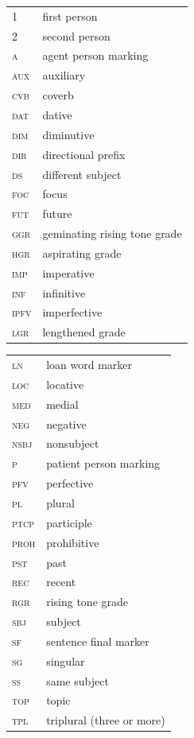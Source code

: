 \documentclass[output=paper,colorlinks,citecolor=brown]{langscibook}
\begin{document}
\begin{tabularx}{.45\textwidth}{lQ}
\scshape 1 & first person \\ 
\scshape 2 & second person \\ 
\scshape a & agent person marking \\
\scshape aux & auxiliary \\
\scshape cvb & coverb  \\
\scshape dat & dative  \\
\scshape dim & diminutive \\ 
\scshape dir & directional prefix  \\
\scshape ds & different subject \\ 
\scshape foc & focus  \\
\scshape fut & future  \\
\scshape ggr & geminating rising tone grade  \\
\scshape hgr & aspirating grade \\ 
\scshape imp & imperative  \\
\scshape inf & infinitive  \\
\scshape ipfv & imperfective  \\
\scshape lgr & lengthened grade  \\
\end{tabularx}
\begin{tabularx}{.45\textwidth}{lQ}
\scshape ln & loan word marker  \\
\scshape loc & locative  \\
\scshape med &  medial \\
\scshape neg & negative  \\
\scshape nsbj & nonsubject  \\
\scshape p & patient person marking  \\
\scshape pfv & perfective  \\
\scshape pl & plural \\  
\scshape ptcp & participle  \\
\scshape proh & prohibitive  \\
\scshape pst & past  \\
\scshape rec & recent  \\
\scshape rgr & rising tone grade  \\
\scshape sbj & subject  \\
\scshape sf & sentence final marker  \\
\scshape sg & singular  \\
\scshape ss & same subject  \\
\scshape top & topic  \\
\scshape tpl & triplural (three or more) \\
\end{tabularx}


\sloppy\printbibliography[heading=subbibliography,notkeyword=this]
\end{document}

